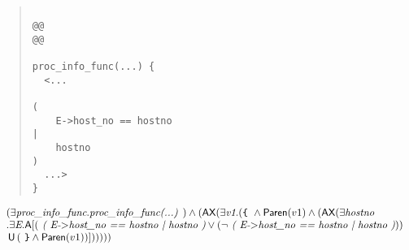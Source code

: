 \documentclass{article}
\newcommand{\U}{\,\mbox{\sf{U}}\,}
\newcommand{\A}{\mbox{\sf{A}}}
\newcommand{\AX}{\mbox{\sf{AX}}}
\newcommand{\mita}[1]{\mbox{\it{{#1}}}}
\newcommand{\msf}[1]{\mbox{\sf{{#1}}}}
\newcommand{\mth}[1]{\({#1}\)}
\newcommand{\ttlb}{\mbox{\tt \char'173}}
\newcommand{\ttrb}{\mbox{\tt \char'175}}
\begin{document}
\[\begin{array}{l}
\end{array}\]

\begin{quote}\begin{verbatim}

@@
@@

proc_info_func(...) {
  <...
    
(
    E->host_no == hostno
|
    hostno
)
  ...>
}
\end{verbatim}\end{quote}

\[\begin{array}{l}
(\exists \mita{proc\_info\_func} . \mita{proc\_info\_func(...) }) \wedge (\AX(\exists \mita{v1} . (\mita{{\ttlb}
  } \wedge \msf{Paren}(v1) \wedge (\AX(\exists \mita{hostno}\\\mbox{} . \exists \mita{E} . \A[(\mita{
(
E-\mth{>}host\_no == hostno
|
hostno
)} \vee (\neg \mita{
(
E-\mth{>}host\_no == hostno
|
hostno
)}))\\\mbox{} \U (\mita{
{\ttrb}} \wedge \msf{Paren}(v1))]
)))))
\end{array}\]
\end{document}
